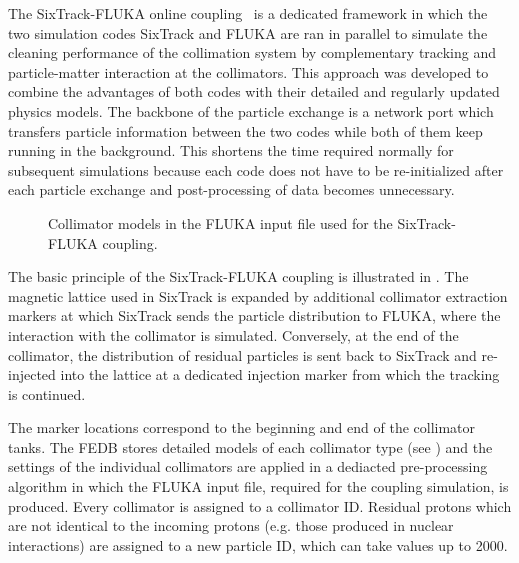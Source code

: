 The SixTrack-FLUKA online coupling~\cite{mereghetti_ipac2013_1} is a dedicated framework in which the two simulation codes SixTrack and FLUKA are ran in parallel to simulate the cleaning performance of the collimation system by complementary tracking and particle-matter interaction at the collimators. This approach was developed to combine the advantages of both codes with their detailed and regularly updated physics models. The backbone of the particle exchange is a network port which transfers particle information between the two codes while both of them keep running in the background. This shortens the time required normally for subsequent simulations because each code does not have to be re-initialized after each particle exchange and post-processing of data becomes unnecessary. 


\begin{figure}[htbp]
  \centering
  \caption{Collimator models in the FLUKA input file used for the SixTrack-FLUKA coupling.}  
  \label{pic:16070701}
  \end{figure}



The basic principle of the SixTrack-FLUKA coupling is illustrated in . The magnetic lattice used in SixTrack is expanded by additional collimator extraction markers at which SixTrack sends the particle distribution to FLUKA, where the interaction with the collimator is simulated. Conversely, at the end of the collimator, the distribution of residual particles is sent back to SixTrack and re-injected into the lattice at a dedicated injection marker from which the tracking is continued. 

The marker locations correspond to the beginning and end of the collimator tanks. The FEDB stores detailed models of each collimator type (see ) and the settings of the individual collimators are applied in a dediacted pre-processing algorithm in which the FLUKA input file, required for the coupling simulation, is produced. Every collimator is assigned to a collimator ID. Residual protons which are not identical to the incoming protons (e.g. those produced in nuclear interactions) are assigned to a new particle ID, which can take values up to 2000. 


